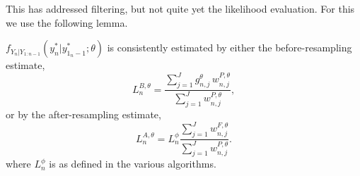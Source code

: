 

This has addressed filtering, but not quite yet the likelihood evaluation. For this we use the following lemma.

\begin{lem}
    \label{lem:lik-proper-weight}
  $f_{Y_n|Y_{1:n-1}}(y_n^*|y_{1_n-1}^*;\theta)$ is consistently estimated by either the before-resampling estimate,
\begin{equation}\label{L1}
L_n^{B,\theta} =  \frac{\sum_{j=1}^Jg^\theta_{n,j} \, w^{P,\theta}_{n,j}}{\sum_{j=1}^J  w^{P,\theta}_{n,j}},
\end{equation}
or by the after-resampling estimate,
\begin{equation}\label{L2}
L_n^{A,\theta} = L^\phi_n \frac{\sum_{j=1}^Jw^{F,\theta}_{n,j}}{\sum_{j=1}^J  w^{P,\theta}_{n,j}}.
\end{equation}
where $L^\phi_n$ is as defined in the various algorithms.
\end{lem}

